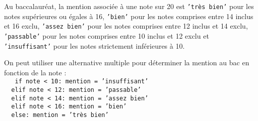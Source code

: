 \begin{ex}
Au baccalauréat, la mention associée à une note sur 20 est
	{\tt 'très bien'} pour les notes supérieures ou égales à 16,
	{\tt 'bien'} pour les notes comprises entre 14 inclus et 16 exclu, 
	{\tt 'assez bien'} pour les notes comprises entre 12 inclus et 14 exclu, 
	{\tt 'passable'} pour les notes comprises entre 10 inclus et 12 exclu et
	{\tt 'insuffisant'} pour les notes strictement inférieures à 10.
\end{ex}
\noindent On peut utiliser une alternative multiple pour déterminer la mention 
au bac en fonction de la note :\\
{\footnotesize\tt
\mbox{}\ \ if note < 10: mention = 'insuffisant'\\
\mbox{}\ \ elif note < 12: mention = 'passable'\\
\mbox{}\ \ elif note < 14: mention = 'assez bien'\\
\mbox{}\ \ elif note < 16: mention = 'bien'\\
\mbox{}\ \ else: mention = 'très bien'\\
}



